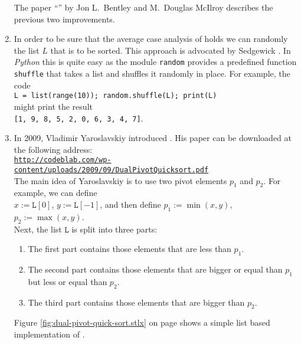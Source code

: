 \begin{enumerate}
      The paper ``'' by Jon L.~Bentley and M.~Douglas McIlroy
      \cite{bentley:93} describes the previous two improvements.
\item In order to be sure that the average case analysis of  holds we can randomly
       the list $L$ that is to be sorted.  This approach is advocated by Sedgewick
      \cite{sedgewick:2011}.  In \textsl{Python} this is quite easy as
      the module \texttt{random} provides a predefined function \texttt{shuffle} that takes a list and shuffles
      it randomly in place.  For example, the code
      \\[0.2cm]
      \hspace*{1.3cm}
      \texttt{L = list(range(10)); random.shuffle(L); print(L)}
      \\[0.2cm]
      might print the result
      \\[0.2cm]
      \hspace*{1.3cm}
      \texttt{[1, 9, 8, 5, 2, 0, 6, 3, 4, 7]}.
\item In 2009, Vladimir Yaroslavskiy introduced  \cite{yaroslavskiy:2009}.  His paper can be
      downloaded at the following address:
      \\[0.2cm]
      \hspace*{-0.3cm}
      \href{http://codeblab.com/wp-content/uploads/2009/09/DualPivotQuicksort.pdf}{\texttt{http://codeblab.com/wp-content/uploads/2009/09/DualPivotQuicksort.pdf}}
      \\[0.2cm]
      The main idea of Yaroslavskiy is to use two pivot elements $p_1$ and $p_2$.  For example, we can
      define
      \\[0.2cm]
      \hspace*{1.3cm}
      $x := \mathtt{L}[0]$, $y := \mathtt{L}[-1]$, \quad and then define \quad $p_1 :=\min(x, y)$, $p_2 := \max(x, y)$.
      \\[0.2cm]
      Next, the list $\mathtt{L}$ is split into three parts:
      \begin{enumerate}
      \item The first part contains those elements that are less than $p_1$.
      \item The second part contains those elements that are bigger or equal than $p_1$ but less or
            equal than $p_2$.
      \item The third part contains those elements that are bigger than $p_2$.
      \end{enumerate}
      Figure \ref{fig:dual-pivot-quick-sort.stlx} on page \pageref{fig:dual-pivot-quick-sort.stlx}
      shows a simple list based implementation of .


\end{enumerate}
